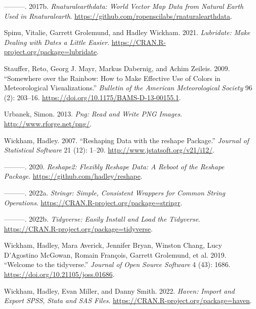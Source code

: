 \documentclass[
]{article}
\newlength{\cslhangindent}
\newlength{\cslentryspacingunit} %
\newenvironment{CSLReferences}[2] %
 {%
  \setlength{\parindent}{0pt}
  \ifodd #1
  \let\oldpar\par
  \def\par{\hangindent=\cslhangindent\oldpar}
  \fi
  \setlength{\parskip}{#2\cslentryspacingunit}
 }%
 {}
\begin{document}
\begin{CSLReferences}{1}{0}
\leavevmode{}%
---------. 2017b. \emph{Rnaturalearthdata: World Vector Map Data from
Natural Earth Used in Rnaturalearth}.
\url{https://github.com/ropenscilabs/rnaturalearthdata}.

\leavevmode{}%
Spinu, Vitalie, Garrett Grolemund, and Hadley Wickham. 2021.
\emph{Lubridate: Make Dealing with Dates a Little Easier}.
\url{https://CRAN.R-project.org/package=lubridate}.

\leavevmode{}%
Stauffer, Reto, Georg J. Mayr, Markus Dabernig, and Achim Zeileis. 2009.
{``Somewhere over the Rainbow: How to Make Effective Use of Colors in
Meteorological Visualizations.''} \emph{Bulletin of the American
Meteorological Society} 96 (2): 203--16.
\url{https://doi.org/10.1175/BAMS-D-13-00155.1}.

\leavevmode{}%
Urbanek, Simon. 2013. \emph{Png: Read and Write PNG Images}.
\url{http://www.rforge.net/png/}.

\leavevmode{}%
Wickham, Hadley. 2007. {``Reshaping Data with the {reshape} Package.''}
\emph{Journal of Statistical Software} 21 (12): 1--20.
\url{http://www.jstatsoft.org/v21/i12/}.

\leavevmode{}%
---------. 2020. \emph{Reshape2: Flexibly Reshape Data: A Reboot of the
Reshape Package}. \url{https://github.com/hadley/reshape}.

\leavevmode{}%
---------. 2022a. \emph{Stringr: Simple, Consistent Wrappers for Common
String Operations}. \url{https://CRAN.R-project.org/package=stringr}.

\leavevmode{}%
---------. 2022b. \emph{Tidyverse: Easily Install and Load the
Tidyverse}. \url{https://CRAN.R-project.org/package=tidyverse}.

\leavevmode{}%
Wickham, Hadley, Mara Averick, Jennifer Bryan, Winston Chang, Lucy
D'Agostino McGowan, Romain François, Garrett Grolemund, et al. 2019.
{``Welcome to the {tidyverse}.''} \emph{Journal of Open Source Software}
4 (43): 1686. \url{https://doi.org/10.21105/joss.01686}.

\leavevmode{}%
Wickham, Hadley, Evan Miller, and Danny Smith. 2022. \emph{Haven: Import
and Export SPSS, Stata and SAS Files}.
\url{https://CRAN.R-project.org/package=haven}.


\end{CSLReferences}
\end{document}
